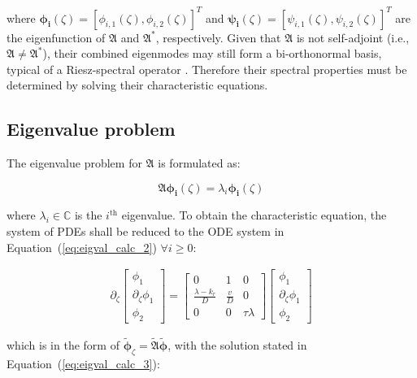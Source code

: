 where $\bm{\phi_i}(\zeta) = [\phi_{i,1}(\zeta), \phi_{i,2}(\zeta)]^T$ and $\bm{\psi_i}(\zeta) = [\psi_{i,1}(\zeta), \psi_{i,2}(\zeta)]^T$ are the eigenfunction of $\mathfrak{A}$ and $\mathfrak{A}^*$, respectively. Given that $\mathfrak{A}$ is not self-adjoint (i.e., $\mathfrak{A} \neq \mathfrak{A}^*$), their combined eigenmodes may still form a bi-orthonormal basis, typical of a Riesz-spectral operator \autocite{curtainbook}. Therefore their spectral properties must be determined by solving their characteristic equations.

\subsection{Eigenvalue problem}

The eigenvalue problem for $\mathfrak{A}$ is formulated as:

\begin{equation} \label{eq:eig_prob}
        \mathfrak{A} \bm{\phi_i}(\zeta) = \lambda_i \bm{\phi_i}(\zeta)
\end{equation}


where $\lambda_i \in \mathbb{C}$ is the $i^{\text{th}}$ eigenvalue. To obtain the characteristic equation, the system of PDEs shall be reduced to the ODE system in Equation~(\ref{eq:eigval_calc_2}) $\forall i \geq 0$:

\begin{equation} \label{eq:eigval_calc_2}
    \begin{aligned}
        \partial_\zeta \begin{bmatrix}
            \phi_1 \\ \partial_\zeta \phi_1 \\ \phi_2
        \end{bmatrix} = \begin{bmatrix}
            0 & 1 & 0 \\
            \frac{\lambda-k_r}{D} & \frac{v}{D} & 0 \\
            0 & 0 & \tau \lambda 
        \end{bmatrix} \begin{bmatrix}
            \phi_1 \\ \partial_\zeta \phi_1 \\ \phi_2
        \end{bmatrix}
    \end{aligned}
\end{equation}

which is in the form of $ \tilde{\bm{\phi}}_\zeta  = \tilde{\mathfrak{A}} \tilde{\bm{\phi}}$, with the solution stated in Equation~(\ref{eq:eigval_calc_3}):

